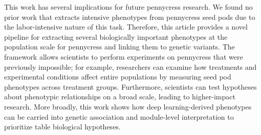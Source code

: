 This work has several implications for future pennycress research. We found no prior work that extracts intensive phenotypes from pennycress seed pods due to the labor-intensive nature of this task. Therefore, this article provides a novel pipeline for extracting several biologically important phenotypes at the population scale for pennycress and linking them to genetic variants. The framework allows scientists to perform experiments on pennycress that were previously impossible; for example, researchers can examine how treatments and experimental conditions affect entire populations by measuring seed pod phenotypes across treatment groups. Furthermore, scientists can test hypotheses about phenotypic relationships on a broad scale, leading to higher-impact research. More broadly, this work shows how deep learning-derived phenotypes can be carried into genetic association and module-level interpretation to prioritize table biological hypotheses.
